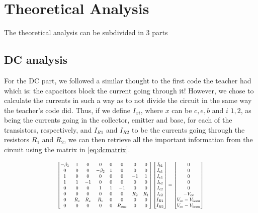 \section{Theoretical Analysis}

The theoretical analysis can be subdivided in 3 parts

\subsection{DC analysis}
For the DC part, we followed a similar thought to the first code the teacher had which is: the capacitors block the current going through it! However, we chose to calculate the currents in such a way as to not divide the circuit in the same way the teacher's code did. Thus, if we define $I_{xi}$, where $x$ can be $c, e, b$ and $i$ $1, 2$, as being the currents going in the collector, emitter and base, for each of the transistors, respectively, and $I_{R1}$ and $I_{R2}$ to be the currents going through the resistors $R_1$ and $R_2$, we can then retrieve all the important information from the circuit using the matrix in \eqref{eq:dcmatrix}.

\begin{equation}
\scalemath{0.7}{
    \begin{bmatrix}
     -\beta_1 & 1 & 0 & 0 & 0 & 0 & 0 & 0\\
     0 & 0 & 0 & -\beta_2 & 1 & 0 & 0 & 0\\
     1 & 0 & 0 & 0 & 0 & 0 & -1 & 1\\
     1 & 1 & -1 & 0 & 0 & 0 & 0 & 0\\
     0 & 0 & 0 & 1 & 1 & -1 & 0 & 0\\
     0 & 0 & 0 & 0 & 0 & 0 & R_2 & R_1\\
     0 & R_c & R_e & R_c & 0 & 0 & 0 & 0\\
     0 & 0 & 0 & 0 & 0 & R_{out} & 0 & 0
    \end{bmatrix} 
    \begin{bmatrix}
        I_{b1}\\
        I_{c1}\\
        I_{e1}\\
        I_{b2}\\
        I_{c2}\\
        I_{e2}\\
        I_{R1}\\
        I_{R2}
    \end{bmatrix}
    =
    \begin{bmatrix}
        0\\
        0\\
        0\\
        0\\
        0\\
        -V_{cc}\\
        V_{cc}-V_{beon}\\
        V_{cc}-V_{beon}
    \end{bmatrix}}
\label{eq:dcmatrix}
\end{equation}
 
